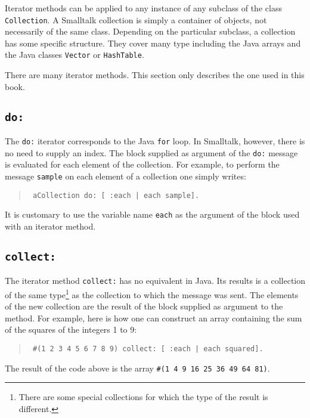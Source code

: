 \documentclass[twoside]{book}
\begin{document}
Iterator methods can be applied to any instance of any subclass of
the class {\tt Collection}. A Smalltalk collection is simply a
container of objects, not necessarily of the same class. Depending
on the particular subclass, a collection has some specific
structure. They cover many type including the Java arrays and the
Java classes {\tt Vector} or {\tt HashTable}.

There are many iterator methods. This section only describes the
one used in this book.

\subsection{\tt do:}
The {\tt do:} iterator corresponds to the Java {\tt for} loop. In
Smalltalk, however, there is no need to supply an index. The block
 supplied as argument of the {\tt do:} message is evaluated
for each element of the collection. For example, to perform the
message {\tt sample} on each element of a collection one simply
writes:
\begin{quote}
\begin{verbatim}
 aCollection do: [ :each | each sample].
\end{verbatim}
\end{quote}
It is customary to use the variable name {\tt each} as the
argument of the block used with an iterator method.

\subsection{\tt collect:}
\label{sec:collect} The iterator method {\tt collect:} has no
equivalent in Java. Its results is a collection of the same
type\footnote{There are some special collections for which the
type of the result is different.} as the collection to which the
message was sent. The elements of the new collection are the
result of the block supplied as argument to the method.
For example, here is how one can construct an array containing the
sum of the squares of the integers 1 to 9:
\begin{quote}
\begin{verbatim}
 #(1 2 3 4 5 6 7 8 9) collect: [ :each | each squared].
\end{verbatim}
\end{quote}
The result of the code above is the array {\tt \#(1 4 9 16 25 36
49 64 81)}.
\end{document}
